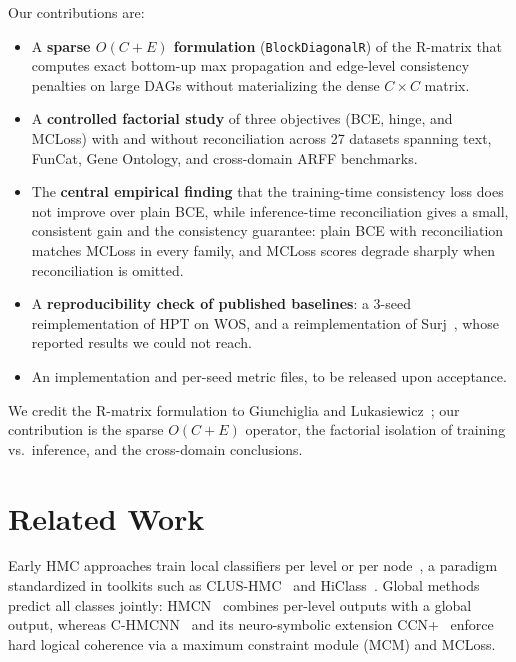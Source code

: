 \documentclass[conference]{IEEEtran}
\begin{document}
Our contributions are:
\begin{itemize}
  \item A \textbf{sparse $O(C{+}E)$ formulation} (\texttt{BlockDiagonalR}) of
  the R-matrix that computes exact bottom-up max propagation and edge-level
  consistency penalties on large DAGs without materializing the dense
  $C\times C$ matrix.
  \item A \textbf{controlled factorial study} of three objectives (BCE, hinge,
  and MCLoss) with and without reconciliation across 27 datasets spanning text,
  FunCat, Gene Ontology, and cross-domain ARFF benchmarks.
  \item The \textbf{central empirical finding} that the training-time
  consistency loss does not improve over plain BCE, while inference-time
  reconciliation gives a small, consistent gain and the consistency guarantee:
  plain BCE with reconciliation matches MCLoss in every family, and MCLoss
  scores degrade sharply when reconciliation is omitted.
  \item A \textbf{reproducibility check of published baselines}: a 3-seed
  reimplementation of HPT on WOS, and a reimplementation of
  Surj~\cite{www2022ontology}, whose reported results we could not reach.
  \item An implementation and per-seed metric files, to be released upon
  acceptance.
\end{itemize}
{\sloppy{}
We credit the R-matrix formulation to Giunchiglia and Lukasiewicz~\cite{chmcnn};
our contribution is the sparse $O(C{+}E)$ operator, the factorial isolation of
training vs.\ inference, and the cross-domain conclusions.\par}

\section{Related Work}
\label{sec:related}

Early HMC approaches train local classifiers per level or per node~\cite{silla2011hmc,cerri2014hmc},
a paradigm standardized in toolkits such as CLUS-HMC~\cite{clus} and
HiClass~\cite{miranda2023hiclass}. Global methods predict all classes jointly:
HMCN~\cite{weihs2018hmc} combines per-level outputs with a global output, whereas C-HMCNN~\cite{chmcnn} and its neuro-symbolic extension
CCN+~\cite{giunchiglia2024ccn} enforce hard logical coherence via a maximum
constraint module (MCM) and MCLoss.
\end{document}
